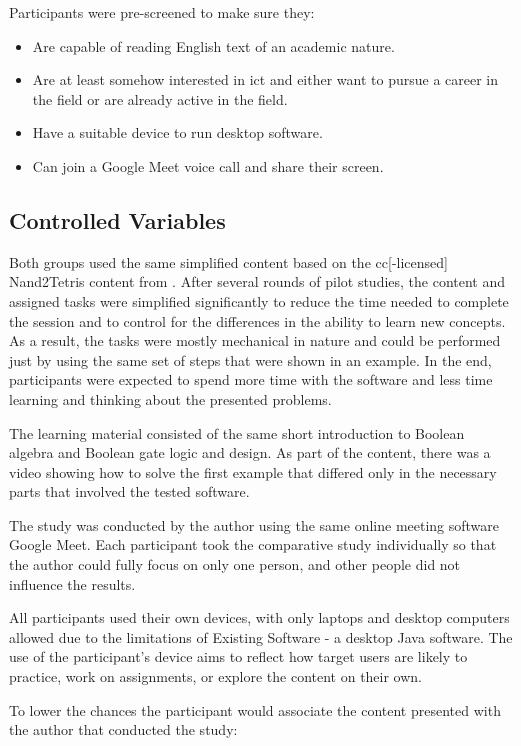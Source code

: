 Participants were pre-screened to make sure they:
\begin{itemize}
    \item Are capable of reading English text of an academic nature.
    \item Are at least somehow interested in \gls{ict} and either want to pursue a career in the field or are already active in the field.
    \item Have a suitable device to run desktop software.
    \item Can join a Google Meet voice call and share their screen.
\end{itemize}

\subsection{Controlled Variables}

Both groups used the same simplified content based on the \gls{cc}[-licensed] Nand2Tetris content from \textcite{nand2tetris}.
After several rounds of pilot studies, the content and assigned tasks were simplified significantly to reduce the time needed to complete the session and to control for the differences in the ability to learn new concepts.
As a result, the tasks were mostly mechanical in nature and could be performed just by using the same set of steps that were shown in an example.
In the end, participants were expected to spend more time with the software and less time learning and thinking about the presented problems.

The learning material consisted of the same short introduction to Boolean algebra and Boolean gate logic and design.
As part of the content, there was a video showing how to solve the first example that differed only in the necessary parts that involved the tested software.

The study was conducted by the author using the same online meeting software Google Meet.
Each participant took the comparative study individually so that the author could fully focus on only one person, and other people did not influence the results.

All participants used their own devices, with only laptops and desktop computers allowed due to the limitations of Existing Software - a desktop Java software.
The use of the participant's device aims to reflect how target users are likely to practice, work on assignments, or explore the content on their own.

To lower the chances the participant would associate the content presented with the author that conducted the study:

